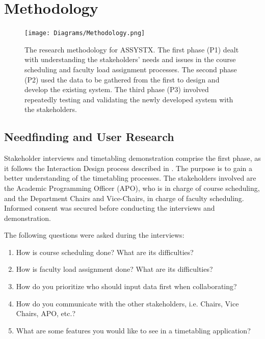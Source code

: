 

\section{Methodology}

\begin{figure}[h]
   \centering
   \texttt{[image: Diagrams/Methodology.png]}
   \caption{The research methodology for ASSYSTX. The first phase (P1) dealt with understanding the stakeholders' needs and issues in the course scheduling and faculty load assignment processes. The second phase (P2) used the data to be gathered from the first to design and develop the existing system. The third phase (P3) involved repeatedly testing and validating the newly developed system with the stakeholders.}
    \label{fig:pipelinediagram}
\end{figure}


\subsection{Needfinding and User Research}
Stakeholder interviews and timetabling demonstration comprise the first phase, as it follows the Interaction Design process described in \cite{Dix:2003:HI:1203012}. The purpose is to gain a better understanding of the timetabling processes. The stakeholders involved are the Academic Programming Officer (APO), who is in charge of course scheduling, and the Department Chairs and Vice-Chairs, in charge of faculty scheduling. Informed consent was secured before conducting the interviews and demonstration.

The following questions were asked during the interviews:
\begin{enumerate}
    \item How is course scheduling done? What are its difficulties?
    \item How is faculty load assignment done? What are its difficulties?
    \item How do you prioritize who should input data first when collaborating?
    \item How do you communicate with the other stakeholders, i.e. Chairs, Vice Chairs, APO, etc.?
    \item What are some features you would like to see in a timetabling application?
\end{enumerate}

